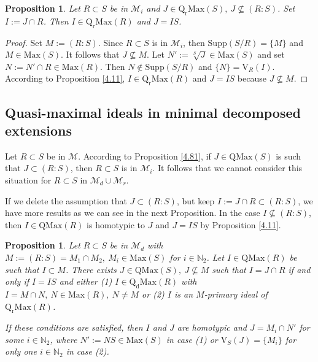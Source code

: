 \documentclass[12pt,leqno]{amsart}
\newtheorem{proposition}[theorem]{Proposition}
\theoremstyle{definition}
\begin{document}
\begin{proposition}\label{4.82} Let $R\subset S$ be in $\mathcal M_i$ and $J\in\mathrm{Q_rMax}(S),\ J\not\subseteq (R:S)$. Set $I:=J\cap R$. Then $I\in\mathrm{Q_rMax}(R)$ and $J=IS$.
\end{proposition} 
\begin{proof} Set $M:=(R:S)$. Since $R\subset S$ is in $\mathcal M_i$, then $\mathrm{Supp}(S/R)=\{M\}$ and $M\in\mathrm{Max}(S)$. It follows that $J\not\subseteq M$. Let $N':=\sqrt[S]J\in\mathrm{Max}(S)$ and set $ N:=N'\cap R\in\mathrm{Max}(R)$. Then $N\not\in\mathrm{Supp}(S/R)$ and $\{N\}=\mathrm{V}_R(I)$. According to Proposition \ref{4.11}, $I\in \mathrm{Q_rMax}(R)$ and $J=IS$ because $J\not\subseteq M$.
\end{proof}

 \subsection{Quasi-maximal ideals in minimal decomposed   extensions}
 
Let $R\subset S$ be in $\mathcal M$. According to Proposition \ref{4.81}, if $J\in\mathrm{QMax}(S)$ is such that $J\subset (R:S)$, then $R\subset S$ is in $\mathcal M_i$. It follows that we cannot consider this situation for $R\subset S$ in $\mathcal M_d\cup\mathcal M_r$. 

If we delete the assumption that $J\subset(R:S)$, but keep $I:=J\cap R\subset (R:S)$, we have more results as we can see in the next Proposition. In the case $I\not\subseteq(R:S)$, then $I\in\mathrm{QMax}(R)$ is homotypic to $J$ and $J=IS$ by Proposition \ref{4.11}. 

\begin{proposition}\label{4.111} Let $R\subset S$ be in $\mathcal M_d$ with $M:=(R:S)=M_1\cap M_2,\ M_i\in\mathrm{Max}(S)$ for $i\in\mathbb N _2$. Let $I\in\mathrm{QMax}(R)$ be such that $I\subset M$. There exists $J\in\mathrm{QMax}(S),\ J\not\subseteq M$ such that $I=J\cap R$ if and only if $I=IS$ and either (1) $I\in\mathrm{Q_dMax}(R)$ with $I=M\cap N,\ N\in\mathrm{Max}(R),\ N\neq M$ or (2) $I$ is an $M$-primary ideal of $\mathrm{Q_rMax}(R)$.

If these conditions are satisfied, then $I$ and $J$ are homotypic and $J=M _i\cap N'$ for some $i\in\mathbb N_2$, where $N':=NS\in\mathrm{Max}(S)$ in case (1) or $\mathrm{V}_S(J)=\{M_i\}$ for only one $i\in\mathbb N_2$ in case (2). 
\end{proposition}
\end{document}
